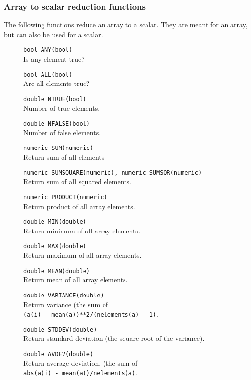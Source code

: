 \subsubsection{Array to scalar reduction functions}
The following functions reduce an array to a scalar.
They are meant for an array, but can also be used for a scalar.
\begin{description}
  \item[] \texttt{bool ANY(bool)}\\
    Is any element true?
  \item[] \texttt{bool ALL(bool)}\\
    Are all elements true?
  \item[] \texttt{double NTRUE(bool)}\\
    Number of true elements.
  \item[] \texttt{double NFALSE(bool)}\\
    Number of false elements.
  \item[] \texttt{numeric SUM(numeric)}\\
    Return sum of all elements.
  \item[] \texttt{numeric SUMSQUARE(numeric), numeric SUMSQR(numeric)}\\
    Return sum of all squared elements.
  \item[] \texttt{numeric PRODUCT(numeric)}\\
    Return product of all array elements.
  \item[] \texttt{double MIN(double)}\\
    Return minimum of all array elements.
  \item[] \texttt{double MAX(double)}\\
    Return maximum of all array elements.
  \item[] \texttt{double MEAN(double)}\\
    Return mean of all array elements.
  \item[] \texttt{double VARIANCE(double)}\\
    Return variance (the sum of
    \\\texttt{(a(i) - mean(a))**2/(nelements(a) - 1)}.
  \item[] \texttt{double STDDEV(double)}\\
    Return standard deviation (the square root of the variance).
  \item[] \texttt{double AVDEV(double)}\\
    Return average deviation. (the sum of
    \\\texttt{abs(a(i) - mean(a))/nelements(a)}.

\end{description}
